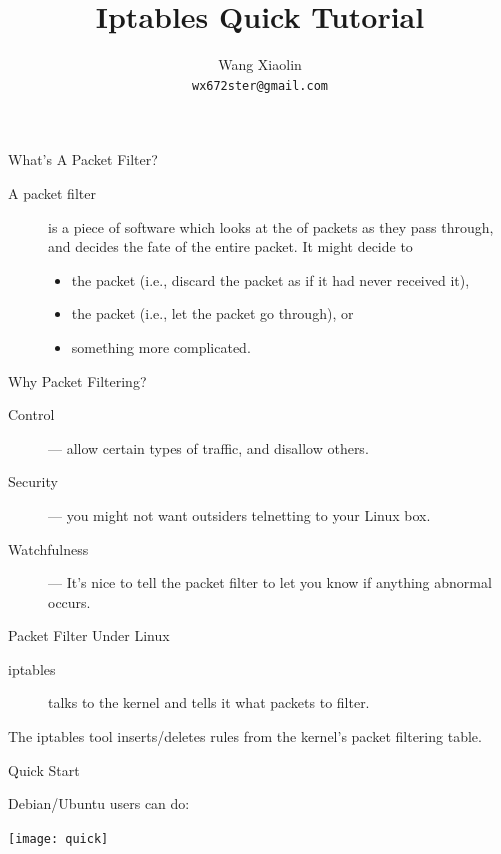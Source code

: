 \documentclass{wx672beamer}
\begin{document}
  
\begin{frame}
  \title{Iptables Quick Tutorial}
  \author{Wang Xiaolin\\\texttt{\small wx672ster@gmail.com}}
  \titlepage
\end{frame}

\begin{frame}{What's A Packet Filter?}
  \begin{description}
  \item[A packet filter] is a piece of software which looks at the
     of packets as they pass through, and decides the
    fate of the entire packet. It might decide to
    \begin{itemize}
    \item {} the packet (i.e., discard the packet as if it
      had never received it),
    \item {} the packet (i.e., let the packet go
      through), or
    \item something more complicated.
    \end{itemize}
  \end{description}
\end{frame}

\begin{frame}{Why Packet Filtering?}
  \begin{description}
  \item[Control] --- allow certain types of traffic, and disallow others.
  \item[Security] --- you might not want outsiders telnetting to your Linux box.
  \item[Watchfulness] --- It's nice to tell the packet filter to let you know if anything
    abnormal occurs.
  \end{description}
\end{frame}

\begin{frame}{Packet Filter Under Linux}
  \begin{description}
  \item[iptables] talks to the kernel and tells it what packets to filter.
  \end{description}
  The iptables tool inserts/deletes rules from the kernel's packet filtering table.
\end{frame}

\begin{frame}{Quick Start}
  \begin{block}{Debian/Ubuntu users can do:}
    \begin{center}
      \texttt{[image: quick]}
    \end{center}
  \end{block}
\end{frame}
\end{document}
